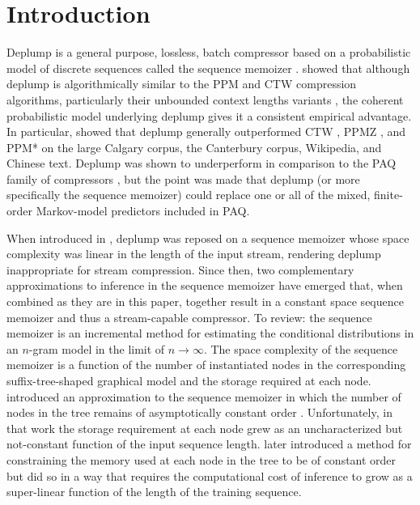 \section{Introduction}
\label{sec:introduction}

Deplump \citep{Gasthaus2010} is a general purpose, lossless, batch compressor based on a probabilistic model of discrete sequences called the sequence memoizer \citep{Wood2009}.   \citeauthor{Gasthaus2010} showed that although deplump is algorithmically similar to the PPM and CTW compression algorithms, particularly their unbounded context lengths variants \citep{Cleary1997,Willems1998}, the coherent probabilistic model underlying deplump gives it a consistent empirical advantage.  In particular, \citeauthor{Gasthaus2010} showed that deplump generally outperformed CTW  \citep{Willems2009}, PPMZ \citep{Peltola2002}, and PPM* \citep{Cleary1997} on the large Calgary corpus, the Canterbury corpus, Wikipedia, and Chinese text.  Deplump was shown to underperform in comparison to the PAQ family of compressors \citep{Mahoney2005}, but the point was made that deplump (or more specifically the sequence memoizer) could replace one or all of the mixed, finite-order Markov-model predictors included in PAQ.  

When introduced in \citep{Gasthaus2010}, deplump was reposed on a sequence memoizer \citep{Wood2009} whose space complexity was linear in the length of the input stream, rendering deplump inappropriate for stream compression.  Since then, two complementary approximations to inference in the sequence memoizer have emerged that, when combined as they are in this paper, together result in a constant space sequence memoizer and thus a stream-capable compressor. To review: the sequence memoizer is an incremental method for estimating the conditional distributions in an $n$-gram model in the limit of $n\rightarrow\infty$.  The space complexity of the sequence memoizer is a function of the number of instantiated nodes in the corresponding suffix-tree-shaped graphical model and the storage required at each node. \citeauthor{Bartlett2010} introduced an approximation to the sequence memoizer in which the number of nodes in the tree remains of asymptotically constant order \citep{Bartlett2010}.  Unfortunately, in that work the storage requirement at each node grew as an uncharacterized but not-constant function of the input sequence length.  \citeauthor{Gasthaus2011} later introduced a method for constraining the memory used at each node in the tree to be of constant order  \citep{Gasthaus2011} but did so in a way that requires the computational cost of inference to grow as a super-linear function of the length of the training sequence.

